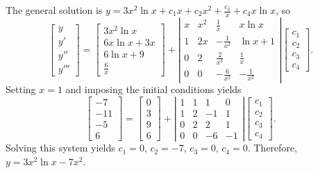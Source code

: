 \documentclass{ximera}
\begin{document}
\begin{problem}
\begin{solution}
The general solution is $y=3x^2\ln x+c_1x+c_2x^2+\frac{c_3}{x}
+c_4x\ln x$, so
$$
\left[\begin{array}{l}y\\y'\\y''\\y'''
\end{array}\right]=
\left[\begin{array}{c}
3x^2\ln x\\6x\ln x+3x\\6\ln x+9\\\frac{6}{x}
\end{array}\right]+
\left|\begin{array}{cccc}
x&x^2&\frac{1}{x}&x\ln x\\1&2x&-\frac{1}{x^2}&\ln x+1\\
0&2&\frac{2}{x^3}&\frac{1}{x}\\0&0&-\frac{6}{x^2}&-\frac{1}{x^2}
\end{array}\right|
\left[\begin{array}{c}
c_1\\c_2\\c_3\\c_4
\end{array}\right].
$$
Setting $x=1$ and imposing the initial conditions yields
$$
\left[\begin{array}{c}
-7\\-11\\-5\\6
\end{array}\right]=
\left[\begin{array}{r}
0\\3\\9\\6
\end{array}\right]+
\left|\begin{array}{rrrr}1&1&1&0\\1&2&-1&1
\\0&2&2&1\\0&0&-6&-1\end{array}\right|
\left[\begin{array}{c}
c_1\\c_2\\c_3\\c_4
\end{array}\right].
$$
Solving this system yields $c_1=0$, $c_2=-7$, $c_3=0$, $c_4=0$.
Therefore,
 $y=3x^2\ln x-7x^2$.
\end{solution}
\end{problem}
\end{document}
